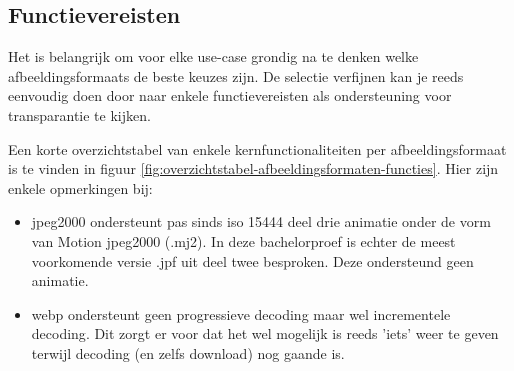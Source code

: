 \subsection{Functievereisten}
\label{sec:afbeeldingscompressie-functievereisten}

Het is belangrijk om voor elke \gls{use-case} grondig na te denken welke \glspl{afbeeldingsformaat} de beste keuzes zijn. De selectie verfijnen kan je reeds eenvoudig doen door naar enkele functievereisten als ondersteuning voor transparantie te kijken. 

Een korte overzichtstabel van enkele kernfunctionaliteiten per \gls{afbeeldingsformaat} is te vinden in figuur \ref{fig:overzichtstabel-afbeeldingsformaten-functies}. Hier zijn enkele opmerkingen bij:

\begin{itemize}
	\item \gls{jpeg2000} ondersteunt pas sinds \gls{iso} 15444 deel drie animatie onder de vorm van Motion \gls{jpeg2000} (.mj2). In deze bachelorproef is echter de meest voorkomende versie .jpf uit deel twee besproken. Deze ondersteund geen animatie.
	
	\item \Gls{webp} ondersteunt geen progressieve \gls{decoding} maar wel incrementele \gls{decoding}. Dit zorgt er voor dat het wel mogelijk is reeds 'iets' weer te geven terwijl \gls{decoding} (en zelfs download) nog gaande is.
\end{itemize}

